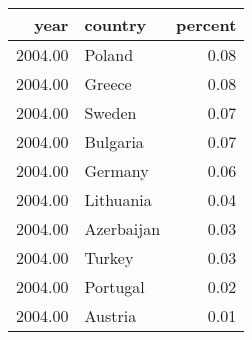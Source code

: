 \begin{table}[ht]
\centering
\begin{tabular}{rlr}
  \hline
year & country & percent \\ 
  \hline
2004.00 & Poland & 0.08 \\ 
  2004.00 & Greece & 0.08 \\ 
  2004.00 & Sweden & 0.07 \\ 
  2004.00 & Bulgaria & 0.07 \\ 
  2004.00 & Germany & 0.06 \\ 
  2004.00 & Lithuania & 0.04 \\ 
  2004.00 & Azerbaijan & 0.03 \\ 
  2004.00 & Turkey & 0.03 \\ 
  2004.00 & Portugal & 0.02 \\ 
  2004.00 & Austria & 0.01 \\ 
   \hline
\end{tabular}
\end{table}
